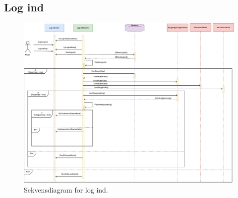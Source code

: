 \subsection*{Log ind}

\begin{figure} [H]
\centering
\includegraphics[width=1.1\textwidth]{figures/Sek/SEKLogInd}
\caption{Sekvensdiagram for log ind.}
\label{fig:SEKLogind}
\end{figure}